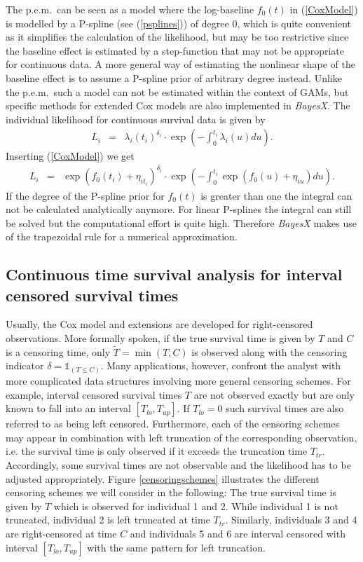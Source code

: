 \documentclass[11pt,a4paper,twoside]{bayesxarticle}
\begin{document}
The p.e.m.~can be seen as a model where the log-baseline $f_0(t)$
in (\ref{CoxModel}) is modelled by a P-spline (see
(\ref{psplines})) of degree 0, which is quite convenient as it
simplifies the calculation of the likelihood, but may be too
restrictive since the baseline effect is estimated by a
step-function that may not be appropriate for continuous data. A
more general way of estimating the nonlinear shape of the baseline
effect is to assume a P-spline prior of arbitrary degree instead.
Unlike the p.e.m.~such a model can not be estimated within the
context of GAMs, but specific methods for extended Cox models are
also implemented in {\it BayesX}. The individual likelihood for
continuous survival data is given by
\begin{eqnarray}\nonumber
L_i &=&\lambda_i(t_i)^{\delta_i}\cdot
\exp\left(-\int_{0}^{t_i}\lambda_i(u)du\right).
\end{eqnarray}
Inserting (\ref{CoxModel}) we get
\begin{eqnarray}\nonumber
L_i &=&\exp(f_0(t_i)+\eta_{i t_i})^{\delta_i}\cdot
\exp\left(-\int_{0}^{t_i}\exp(f_0(u)+\eta_{iu})du\right).
\end{eqnarray}
If the degree of the P-spline prior for $f_0(t)$ is greater than
one the integral can not be calculated analytically anymore. For
linear P-splines the integral can still be solved but the
computational effort is quite high. Therefore {\it BayesX} makes
use of the trapezoidal rule for a numerical approximation.

\subsection{Continuous time survival analysis for interval censored survival times}
\label{intervalcensoring}

Usually, the Cox model and extensions are developed for
right-censored observations. More formally spoken, if the true
survival time is given by $T$ and $C$ is a censoring time, only
$\tilde{T}=\min(T,C)$ is observed along with the censoring indicator
$\delta=\mathds{1}_{(T\le C)}$. Many applications, however, confront
the analyst with more complicated data structures involving more
general censoring schemes. For example, interval censored survival
times $T$ are not observed exactly but are only known to fall into
an interval $[T_{lo},T_{up}]$. If $T_{lo}=0$ such survival times are
also referred to as being left censored. Furthermore, each of the
censoring schemes may appear in combination with left truncation of
the corresponding observation, i.e. the survival time is only
observed if it exceeds the truncation time $T_{tr}$. Accordingly,
some survival times are not observable and the likelihood has to be
adjusted appropriately. Figure \ref{censoringschemes} illustrates
the different censoring schemes we will consider in the following:
The true survival time is given by $T$ which is observed for
individual 1 and 2. While individual 1 is not truncated, individual
2 is left truncated at time $T_{tr}$. Similarly, individuals 3 and 4
are right-censored at time $C$ and individuals 5 and 6 are interval
censored with interval $[T_{lo},T_{up}]$ with the same pattern for
left truncation.
\end{document}
